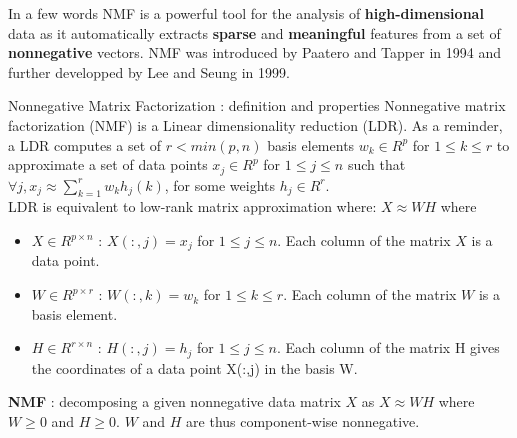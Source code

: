 \documentclass[final]{beamer}
\newlength{\threecolwid}
\begin{document}
\begin{frame}
\begin{columns}[t]
\begin{column}{\threecolwid}
\begin{exampleblock}{In a few words}
NMF is a powerful tool for the analysis of \textbf{high-dimensional} data as it automatically extracts \textbf{sparse} and \textbf{meaningful} features from a set of \textbf{nonnegative} vectors.
NMF was introduced by Paatero and Tapper %
in 1994 and further developped by Lee and Seung %
in 1999.
\end{exampleblock}


\begin{exampleblock}{Nonnegative Matrix Factorization : definition and properties}
Nonnegative matrix factorization (NMF) is a Linear dimensionality reduction (LDR). As a reminder, a LDR computes a set of $r < min(p,n)$ basis elements $w_k \in R^p$ for $1 \leq k \leq r$ to approximate a set of data points $x_j \in R^{p}$ for $1 \leq j \leq n$ such that $\forall j, x_j \approx \sum_{k = 1}^{r} w_{k} h_{j}(k)$, for some weights $h_j\in R^r$. \\
LDR is equivalent to low-rank matrix approximation where: $X \approx W H$ where \\
     \begin{itemize}
     \item $X \in R^{p \times n}$ : $X(:,j) = x_j$ for $1 \leq j \leq n$. Each column of the matrix $X$ is a data point.
     \item $W \in R^{p \times r}$ : $W(:,k) = w_k$ for $1 \leq k \leq r$. Each column of the matrix $W$ is a basis element.
     \item $H \in R^{r \times n}$ : $H(:,j) = h_j$ for $1 \leq j \leq n$. Each column of the matrix H gives the coordinates of a data point X(:,j) in the basis W.
     \end{itemize}

     \textbf{NMF} : decomposing a given nonnegative data matrix $X$ as $X \approx W H$ where $W \geq 0$ and $H \geq 0$. $W$ and $H$ are thus component-wise nonnegative.
     
\end{exampleblock}





\end{column}
\end{columns}
\end{frame}
\end{document}
